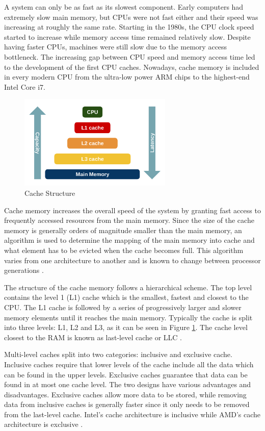 \documentclass[10pt,a4paper,twoside]{book}
\begin{document}
A system can only be as fast as its slowest component. Early computers had extremely slow main memory, but CPUs were not fast either and their speed was increasing at roughly the same rate. Starting in the 1980s, the CPU clock speed started to increase while memory access time remained relatively slow. Despite having faster CPUs, machines were still slow due to the memory access bottleneck. The increasing gap between CPU speed and memory access time led to the development of the first CPU caches. Nowadays, cache memory is included in every modern CPU from the ultra-low power ARM chips to the highest-end Intel Core i7.

\begin{figure}[h]
\centering
\includegraphics[height=4.5cm]{figures/cache.png}
\caption{Cache Structure\cite{cachehierarchyimg}}
\label{fig:cache}
\end{figure}

Cache memory increases the overall speed of the system by granting fast access to frequently accessed resources from the main memory. Since the size of the cache memory is generally orders of magnitude smaller than the main memory, an algorithm is used to determine the mapping of the main memory into cache and what element has to be evicted when the cache becomes full. This algorithm varies from one architecture to another and is known to change between processor generations \cite{oren2015spy}. 

The structure of the cache memory follows a hierarchical scheme. The top level contains the level 1 (L1) cache which is the smallest, fastest and closest to the CPU. The L1 cache is followed by a series of progressively larger and slower memory elements until it reaches the main memory. Typically the cache is split into three levels: L1, L2 and L3, as it can be seen in Figure \ref{fig:cache}. The cache level closest to the RAM is known as last-level cache or LLC \cite{oren2015spy}.

Multi-level caches split into two categories: inclusive and exclusive cache. Inclusive caches require that lower levels of the cache include all the data which can be found in the upper levels. Exclusive caches guarantee that data can be found in at most one cache level. The two designs have various advantages and disadvantages. Exclusive caches allow more data to be stored, while removing data from inclusive caches is generally faster since it only needs to be removed from the last-level cache. Intel's cache architecture is inclusive while AMD's cache architecture is exclusive \cite{oren2015spy}.
\end{document}
